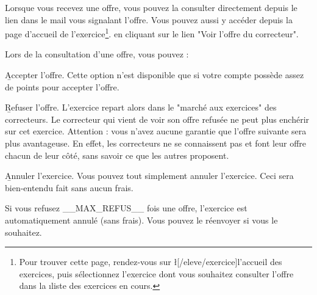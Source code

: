 ﻿Lorsque vous recevez une offre, vous pouvez la consulter directement depuis le lien dans le mail vous signalant l'offre. Vous pouvez aussi y accéder depuis la page d'accueil de l'exercice\footnote{Pour trouver cette page, rendez-vous sur \l[/eleve/exercice]{l'accueil des exercices}, puis sélectionnez l'exercice dont vous souhaitez consulter l'offre dans la \i{liste des exercices en cours}.}. en cliquant sur le lien "Voir l'offre du correcteur".

Lors de la consultation d'une offre, vous pouvez :
\item \b{Accepter l'offre}. Cette option n'est disponible que si votre compte possède assez de points pour accepter l'offre.
\item \b{Refuser l'offre}. L'exercice repart alors dans le "marché aux exercices" des correcteurs. Le correcteur qui vient de voir son offre refusée ne peut plus enchérir sur cet exercice. Attention : vous n'avez aucune garantie que l'offre suivante sera plus avantageuse. En effet, les correcteurs ne se connaissent pas et font leur offre chacun de leur côté, sans savoir ce que les autres proposent.
\item \b{Annuler l'exercice}. Vous pouvez tout simplement annuler l'exercice. Ceci sera bien-entendu fait sans aucun frais.

Si vous refusez __MAX_REFUS__ fois une offre, l'exercice est automatiquement annulé (sans frais). Vous pouvez le réenvoyer si vous le souhaitez.